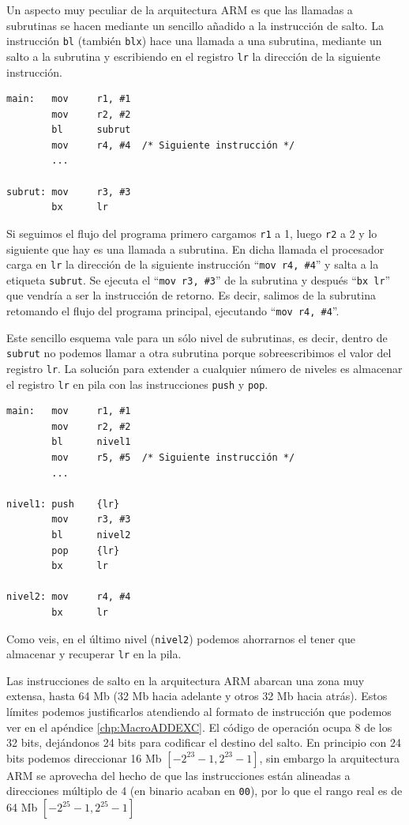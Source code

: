 Un aspecto muy peculiar de la arquitectura ARM es que las llamadas a
subrutinas se hacen mediante un sencillo añadido a la instrucción de salto. La
instrucción {\tt bl} (también {\tt blx}) hace una llamada a una subrutina,
mediante un salto a la subrutina y escribiendo en el registro {\tt lr} la
dirección de la siguiente instrucción.

\begin{lstlisting}
main:   mov     r1, #1
        mov     r2, #2
        bl      subrut
        mov     r4, #4  /* Siguiente instrucción */
        ...

subrut: mov     r3, #3
        bx      lr
\end{lstlisting}

Si seguimos el flujo del programa primero cargamos {\tt r1} a 1, luego {\tt r2}
a 2 y lo siguiente que hay es una llamada a subrutina. En dicha llamada el
procesador carga en {\tt lr} la dirección de la siguiente instrucción ``{\tt mov r4, \#4}''
y salta a la etiqueta {\tt subrut}. Se ejecuta el ``{\tt mov r3, \#3}'' de la subrutina
y después ``{\tt bx lr}'' que vendría a ser la instrucción de retorno. Es decir, salimos
de la subrutina retomando el flujo del programa principal, ejecutando ``{\tt mov r4, \#4}''.

Este sencillo esquema vale para un sólo nivel de subrutinas, es decir, dentro de
{\tt subrut} no podemos llamar a otra subrutina porque sobreescribimos el valor del
registro {\tt lr}. La solución para extender a cualquier número de niveles es almacenar
el registro {\tt lr} en pila con las instrucciones {\tt push} y {\tt pop}.

\begin{lstlisting}
main:   mov     r1, #1
        mov     r2, #2
        bl      nivel1
        mov     r5, #5  /* Siguiente instrucción */
        ...

nivel1: push    {lr}
        mov     r3, #3
        bl      nivel2
        pop     {lr}
        bx      lr

nivel2: mov     r4, #4
        bx      lr
\end{lstlisting}

Como veis, en el último nivel ({\tt nivel2}) podemos ahorrarnos el tener que
almacenar y recuperar {\tt lr} en la pila.

\vspace{0.25cm}
Las instrucciones de salto en la arquitectura ARM abarcan una zona muy extensa,
hasta 64 Mb (32 Mb hacia adelante y otros 32 Mb hacia atrás). Estos límites podemos
justificarlos atendiendo al formato de instrucción que podemos ver en el apéndice
\ref{chp:MacroADDEXC}. El código de operación ocupa 8 de los 32 bits, dejándonos
24 bits para codificar el destino del salto. En principio con 24 bits podemos
direccionar 16 Mb $[-2^{23}-1, 2^{23}-1]$, sin embargo la arquitectura ARM se aprovecha
del hecho de que las instrucciones están alineadas a direcciones múltiplo de 4 (en binario
acaban en {\tt 00}), por lo que el rango real es de 64 Mb $[-2^{25}-1,2^{25}-1]$

